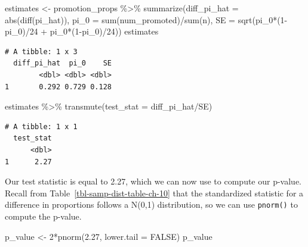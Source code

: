 \documentclass[
  letterpaper,
  DIV=11,
  numbers=noendperiod]{scrreprt}
\newenvironment{Shaded}{\begin{snugshade}}{\end{snugshade}}
\newcommand{\AttributeTok}[1]{\textcolor[rgb]{0.40,0.45,0.13}{#1}}
\newcommand{\ConstantTok}[1]{\textcolor[rgb]{0.56,0.35,0.01}{#1}}
\newcommand{\DecValTok}[1]{\textcolor[rgb]{0.68,0.00,0.00}{#1}}
\newcommand{\FloatTok}[1]{\textcolor[rgb]{0.68,0.00,0.00}{#1}}
\newcommand{\FunctionTok}[1]{\textcolor[rgb]{0.28,0.35,0.67}{#1}}
\newcommand{\NormalTok}[1]{\textcolor[rgb]{0.00,0.23,0.31}{#1}}
\newcommand{\OtherTok}[1]{\textcolor[rgb]{0.00,0.23,0.31}{#1}}
\newcommand{\SpecialCharTok}[1]{\textcolor[rgb]{0.37,0.37,0.37}{#1}}
\theoremstyle{definition}
\theoremstyle{remark}
\begin{document}
\begin{Shaded}
\begin{Highlighting}[]
\NormalTok{estimates }\OtherTok{\textless{}{-}}\NormalTok{ promotion\_props }\SpecialCharTok{\%\textgreater{}\%} 
  \FunctionTok{summarize}\NormalTok{(}\AttributeTok{diff\_pi\_hat =} \FunctionTok{abs}\NormalTok{(}\FunctionTok{diff}\NormalTok{(pi\_hat)),}
            \AttributeTok{pi\_0 =} \FunctionTok{sum}\NormalTok{(num\_promoted)}\SpecialCharTok{/}\FunctionTok{sum}\NormalTok{(n),}
            \AttributeTok{SE =} \FunctionTok{sqrt}\NormalTok{(pi\_0}\SpecialCharTok{*}\NormalTok{(}\DecValTok{1}\SpecialCharTok{{-}}\NormalTok{pi\_0)}\SpecialCharTok{/}\DecValTok{24} \SpecialCharTok{+}\NormalTok{ pi\_0}\SpecialCharTok{*}\NormalTok{(}\DecValTok{1}\SpecialCharTok{{-}}\NormalTok{pi\_0)}\SpecialCharTok{/}\DecValTok{24}\NormalTok{)) }
\NormalTok{estimates}
\end{Highlighting}
\end{Shaded}

\begin{verbatim}
# A tibble: 1 x 3
  diff_pi_hat  pi_0    SE
        <dbl> <dbl> <dbl>
1       0.292 0.729 0.128
\end{verbatim}

\begin{Shaded}
\begin{Highlighting}[]
\NormalTok{estimates }\SpecialCharTok{\%\textgreater{}\%} 
  \FunctionTok{transmute}\NormalTok{(}\AttributeTok{test\_stat =}\NormalTok{ diff\_pi\_hat}\SpecialCharTok{/}\NormalTok{SE)}
\end{Highlighting}
\end{Shaded}

\begin{verbatim}
# A tibble: 1 x 1
  test_stat
      <dbl>
1      2.27
\end{verbatim}

Our test statistic is equal to 2.27, which we can now use to compute our
p-value. Recall from Table~\ref{tbl-samp-dist-table-ch-10} that the
standardized statistic for a difference in proportions follows a N(0,1)
distribution, so we can use \texttt{pnorm()} to compute the p-value.

\begin{Shaded}
\begin{Highlighting}[]
\NormalTok{p\_value }\OtherTok{\textless{}{-}} \DecValTok{2}\SpecialCharTok{*}\FunctionTok{pnorm}\NormalTok{(}\FloatTok{2.27}\NormalTok{, }\AttributeTok{lower.tail =} \ConstantTok{FALSE}\NormalTok{)}
\NormalTok{p\_value}
\end{Highlighting}
\end{Shaded}
\end{document}
